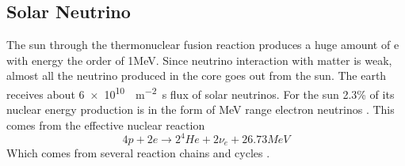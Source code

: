 \subsection{Solar Neutrino}
The sun through the thermonuclear fusion reaction produces a huge amount of e with energy the order of 1MeV. Since neutrino interaction with matter is weak, almost all the neutrino produced in the core goes out from the sun. The earth receives about \SI{6e10}{\centi\per\meter\squared\second} flux of solar neutrinos. For the sun 2.3\% of its nuclear energy production is in the form of MeV range electron neutrinos . This comes from the effective nuclear reaction 
\begin{equation}
	4p+2e\rightarrow2{}^{4}He+2\nu{}_{e}+26.73MeV
\end{equation}
Which comes from several reaction chains and cycles .

